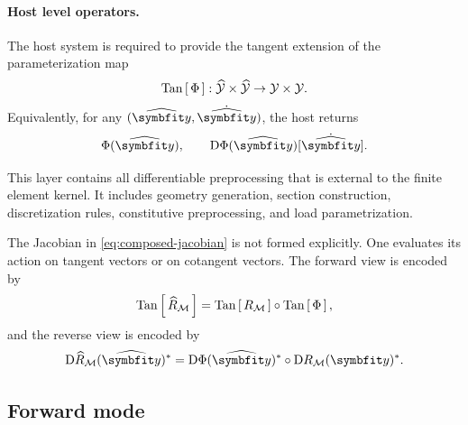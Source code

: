 \paragraph{Host level operators.}

The host system is required to provide the tangent extension of the parameterization map
\[
\operatorname{Tan}\left[\,\Phi\,\right] :
\widehat{\mathcal Y} \times \widehat{\mathcal Y}
\to
\mathcal Y \times \mathcal Y.
\]
Equivalently, for any \((\HostParameters,\dot{\HostParameters})\), the host returns
\[
\ParameterMap(\HostParameters),
\qquad
\D \ParameterMap(\HostParameters)[\dot{\HostParameters}].
\]

This layer contains all differentiable preprocessing that is external to the finite element kernel. It includes geometry generation, section construction, discretization rules, constitutive preprocessing, and load parametrization.


The Jacobian in \eqref{eq:composed-jacobian} is not formed explicitly. One evaluates its action on tangent vectors or on cotangent vectors. The forward view is encoded by
\[
\operatorname{Tan}\left[\,\widehat{R}_{\mathcal M}\,\right]
=
\operatorname{Tan}\left[\,R_{\mathcal M}\,\right]
\circ
\operatorname{Tan}\left[\,\Phi\,\right],
\]
and the reverse view is encoded by
\[
\D \ComposedResponse_{\ModelFamily}(\HostParameters)^*
=
\D \ParameterMap(\HostParameters)^*
\circ
\D \ResponseMap_{\ModelFamily}(\CoreParameters)^*.
\]

\subsection{Forward mode}
\label{sec:jvp}

